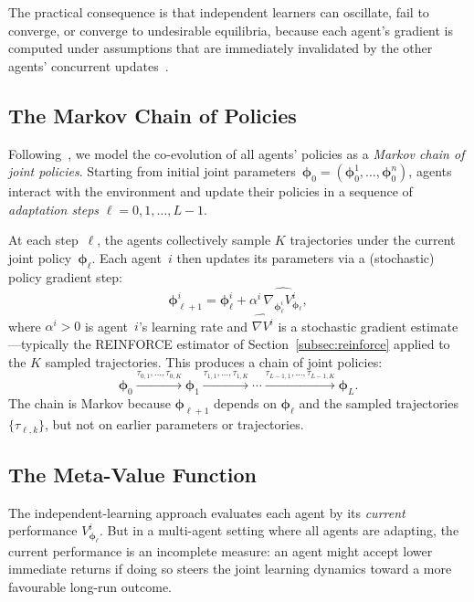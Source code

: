 The practical consequence is that independent learners can oscillate, fail to converge, or converge to undesirable equilibria, because each agent's gradient is computed under assumptions that are immediately invalidated by the other agents' concurrent updates~\cite{busoniu2008}.

\subsection{The Markov Chain of Policies}
\label{subsec:markov-chain-policies}

Following~\cite{kim2021policygradientalgorithmlearning}, we model the co-evolution of all agents' policies as a \emph{Markov chain of joint policies}. Starting from initial joint parameters~$\bm{\phi}_0=(\bm{\phi}_0^1,\ldots,\bm{\phi}_0^n)$, agents interact with the environment and update their policies in a sequence of \emph{adaptation steps} $\ell=0,1,\ldots,L-1$.

At each step~$\ell$, the agents collectively sample $K$ trajectories under the current joint policy~$\bm{\phi}_\ell$. Each agent~$i$ then updates its parameters via a (stochastic) policy gradient step:
\begin{equation}\label{eq:inner-loop}
  \bm{\phi}_{\ell+1}^i = \bm{\phi}_\ell^i + \alpha^i\,\widehat{\nabla_{\bm{\phi}_\ell^i} V^i_{\bm{\phi}_\ell}},
\end{equation}
where $\alpha^i>0$ is agent~$i$'s learning rate and $\widehat{\nabla V^i}$ is a stochastic gradient estimate---typically the REINFORCE estimator of Section~\ref{subsec:reinforce} applied to the $K$ sampled trajectories. This produces a chain of joint policies:
\[
  \bm{\phi}_0 \xrightarrow{\tau_{0,1},\ldots,\tau_{0,K}} \bm{\phi}_1 \xrightarrow{\tau_{1,1},\ldots,\tau_{1,K}} \cdots \xrightarrow{\tau_{L-1,1},\ldots,\tau_{L-1,K}} \bm{\phi}_L.
\]
The chain is Markov because $\bm{\phi}_{\ell+1}$ depends on $\bm{\phi}_\ell$ and the sampled trajectories~$\{\tau_{\ell,k}\}$, but not on earlier parameters or trajectories.

\subsection{The Meta-Value Function}
\label{subsec:meta-value}

The independent-learning approach evaluates each agent by its \emph{current} performance $V^i_{\bm{\phi}_\ell}$. But in a multi-agent setting where all agents are adapting, the current performance is an incomplete measure: an agent might accept lower immediate returns if doing so steers the joint learning dynamics toward a more favourable long-run outcome.

